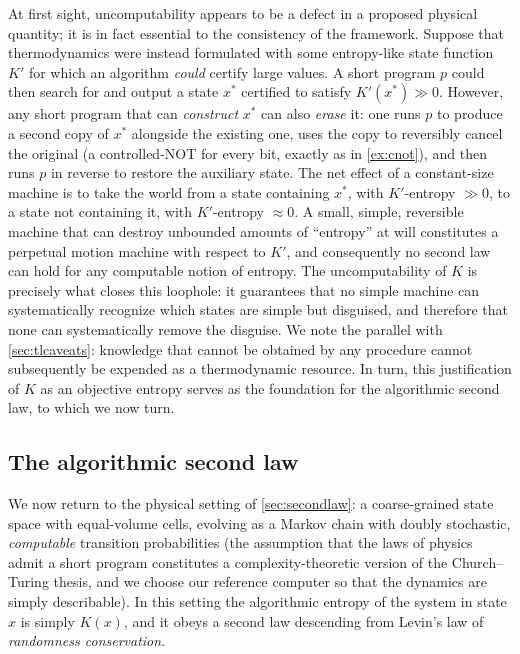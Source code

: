 \documentclass[11pt]{article}
\begin{document}
At first sight, uncomputability appears to be a defect in a proposed physical quantity; it is in fact essential to the consistency of the framework. Suppose that thermodynamics were instead formulated with some entropy-like state function $K'$ for which an algorithm \emph{could} certify large values. A short program $p$ could then search for and output a state $x^*$ certified to satisfy $K'(x^*) \gg 0$. However, any short program that can \emph{construct} $x^*$ can also \emph{erase} it: one runs $p$ to produce a second copy of $x^*$ alongside the existing one, uses the copy to reversibly cancel the original (a controlled-NOT for every bit, exactly as in \cref{ex:cnot}), and then runs $p$ in reverse to restore the auxiliary state. The net effect of a constant-size machine is to take the world from a state containing $x^*$, with $K'$-entropy $\gg 0$, to a state not containing it, with $K'$-entropy $\approx 0$. A small, simple, reversible machine that can destroy unbounded amounts of ``entropy'' at will constitutes a perpetual motion machine with respect to $K'$, and consequently no second law can hold for any computable notion of entropy. The uncomputability of $K$ is precisely what closes this loophole: it guarantees that no simple machine can systematically recognize which states are simple but disguised, and therefore that none can systematically remove the disguise. We note the parallel with \cref{sec:tlcaveats}: knowledge that cannot be obtained by any procedure cannot subsequently be expended as a thermodynamic resource. In turn, this justification of $K$ as an objective entropy serves as the foundation for the algorithmic second law, to which we now turn.

\subsection{The algorithmic second law}
\label{sec:algsecondlaw}

We now return to the physical setting of \cref{sec:secondlaw}: a coarse-grained state space with equal-volume cells, evolving as a Markov chain with doubly stochastic, \emph{computable} transition probabilities (the assumption that the laws of physics admit a short program constitutes a complexity-theoretic version of the Church--Turing thesis, and we choose our reference computer so that the dynamics are simply describable). In this setting the algorithmic entropy of the system in state $x$ is simply $K(x)$, and it obeys a second law descending from Levin's law of \emph{randomness conservation}.
\end{document}
